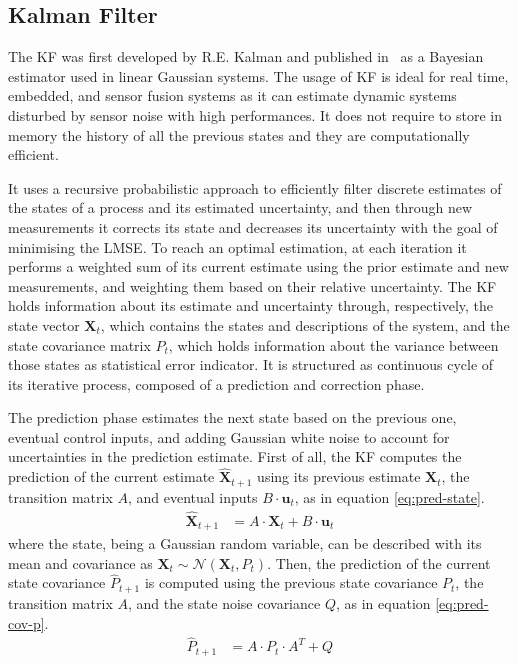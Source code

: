 \subsection{Kalman Filter}

\noindent The \gls{KF} was first developed by R.E. Kalman and published in~\cite{kalman} as a Bayesian estimator used in linear Gaussian systems.
The usage of \gls{KF} is ideal for real time, embedded, and sensor fusion systems as it can estimate dynamic systems disturbed by sensor noise with high performances.
It does not require to store in memory the history of all the previous states and they are computationally efficient.

It uses a recursive probabilistic approach to efficiently filter discrete estimates of the states of a process and its estimated uncertainty, and then through new measurements it corrects its state and decreases its uncertainty with the goal of minimising the \gls{LMSE}.
To reach an optimal estimation, at each iteration it performs a weighted sum of its current estimate using the prior estimate and new measurements, and weighting them based on their relative uncertainty.
The \gls{KF} holds information about its estimate and uncertainty through, respectively, the state vector $\mathbf{X}_t$, which contains the states and descriptions of the system, and the state covariance matrix $P_t$,  which holds information about the variance between those states as statistical error indicator.
It is structured as continuous cycle of its iterative process, composed of a prediction and correction phase.

The prediction phase estimates the next state based on the previous one, eventual control inputs, and adding Gaussian white noise to account for uncertainties in the prediction estimate.
First of all, the \gls{KF} computes the prediction of the current estimate $\hat{\mathbf{X}}_{t+1}$ using its previous estimate $\mathbf{X}_t $, the transition matrix $A$, and eventual inputs $B \cdot \mathbf{u}_t$, as in equation \eqref{eq:pred-state}.%
\begin{align}
\hat{\mathbf{X}}_{t+1} & = A \cdot \mathbf{X}_t + B \cdot \mathbf{u}_t %
  \label{eq:pred-state}
\end{align}
where the state, being a Gaussian random variable, can be described with its mean and covariance as $\mathbf{X}_{t} \sim \mathcal{N}\left(\mathbf{X}_{t},P_{t}\right)$.%
Then, the prediction of the current state covariance $\hat{P}_{t+1}$ is computed using the previous state covariance $P_t$, the transition matrix $A$, and the state noise covariance $Q$, as in equation \eqref{eq:pred-cov-p}.
    \begin{align}
    	\label{eq:pred-cov-p}
        \hat{P}_{t+1} & = A \cdot P_t \cdot A^T + Q
    \end{align}


